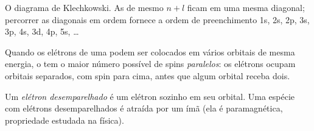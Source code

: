\begin{omfigure}

{\small O diagrama de Klechkowski. As  de mesmo $n + l$ ficam
em uma mesma diagonal; percorrer as diagonais em ordem fornece a ordem de
preenchimento 1s, 2s, 2p, 3s, 3p, 4s, 3d, 4p, 5s, \dots}
\end{omfigure}

\begin{proposition}\label{prop:b1:quantum-numbers:hund}
Quando os elétrons de uma  podem ser colocados em vários
orbitais de mesma energia, o  tem o maior número
possível de spins \emph{paralelos}: os elétrons ocupam orbitais
separados, com spin para cima, antes que algum orbital receba dois.
\end{proposition}
\admitted

\begin{definition}\label{def:b1:quantum-numbers:unpaired}
Um \emph{elétron desemparelhado} é um elétron
sozinho em seu orbital. Uma espécie com elétrons desemparelhados é
atraída por um ímã (ela é paramagnética, propriedade estudada na física).
\end{definition}

